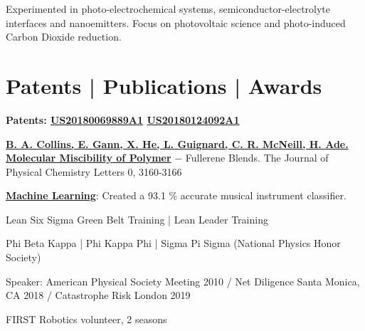 \documentclass[letterpaper]{deedy-resume} %
\begin{document}
\begin{minipage}[t]{0.66\textwidth}

\sectionspace %
\begin{tightitemize}
\item Experimented in photo-electrochemical systems, semiconductor-electrolyte interfaces and nanoemitters. Focus on photovoltaic science and photo-induced Carbon Dioxide reduction.
\end{tightitemize}

\sectionspace %





\sectionspace %




\section{Patents | Publications | Awards}
\vspace{\topsep} %
\begin{tightitemize}
\item {\bf Patents: \href{https://patents.google.com/patent/US20180069889A1/en?oq=US20180069889A1}{US20180069889A1} \href{https://patents.google.com/patent/US20180124092A1/en?oq=US20180124092A1}{US20180124092A1}}
\item \href{https://pubs.acs.org/doi/abs/10.1021/jz101276h}{\bf B. A. Collins, E. Gann, X. He, L. Guignard, C. R. McNeill, H. Ade. Molecular Miscibility of Polymer}
− Fullerene Blends. The Journal of Physical Chemistry Letters 0, 3160-3166

\item \href{http://cs229.stanford.edu/proj2015/010_report.pdf}{\bf Machine Learning}: Created a 93.1 \% accurate musical instrument classifier.
\item Lean Six Sigma Green Belt Training | Lean Leader Training
\item Phi Beta Kappa | Phi Kappa Phi | Sigma Pi Sigma (National Physics Honor Society)
\item Speaker: American Physical Society Meeting 2010 / Net Diligence Santa Monica, CA 2018 / Catastrophe Risk London 2019 
\item FIRST Robotics volunteer, 2 seasons
\end{tightitemize}



\end{minipage}
\end{document}
